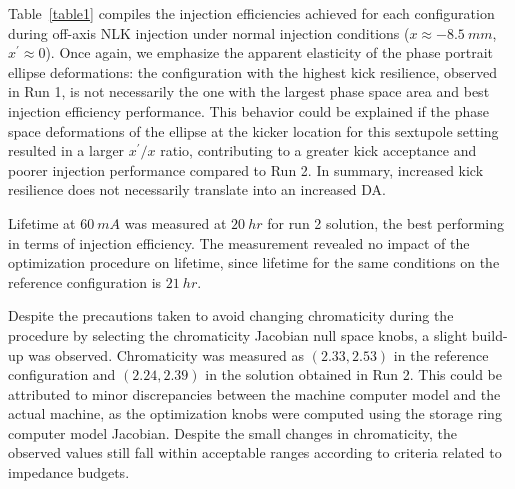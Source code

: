 Table~\ref{table1} compiles the injection efficiencies achieved for each configuration during off-axis NLK injection under normal injection conditions ($x\approx -8.5~\unit{mm}$, $x^\prime\approx 0 $).
Once again, we emphasize the apparent elasticity of the phase portrait ellipse deformations: the configuration with the highest kick resilience, observed in Run 1, is not necessarily the one with the largest phase space area and best injection efficiency performance. This behavior could be explained if the phase space deformations of the ellipse at the kicker location for this sextupole setting resulted in a larger $x^\prime/x$ ratio, contributing to a greater kick acceptance and poorer injection performance compared to Run 2. In summary, increased kick resilience does not necessarily translate into an increased DA.

Lifetime at $60~\unit{mA}$ was measured at $20~\unit{hr}$ for run 2 solution, the best performing in terms of injection efficiency. The measurement revealed no impact of the optimization procedure on lifetime, since lifetime for the same conditions on the reference configuration is $21~\unit{hr}$.

Despite the precautions taken to avoid changing chromaticity during the procedure by selecting the chromaticity Jacobian null space knobs, a slight build-up was observed. Chromaticity was measured as $(2.33, 2.53)$ in the reference configuration and $(2.24, 2.39)$ in the solution obtained in Run 2. This could be attributed to minor discrepancies between the machine computer model and the actual machine, as the optimization knobs were computed using the storage ring computer model Jacobian. Despite the small changes in chromaticity, the observed values still fall within acceptable ranges according to criteria related to impedance budgets.

